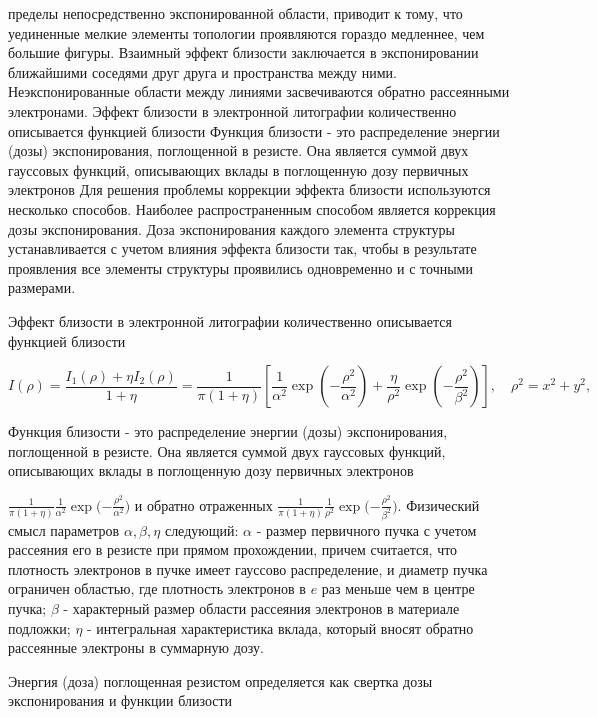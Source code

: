 пределы непосредственно экспонированной области, приводит к тому, что уединенные мелкие элементы топологии проявляются гораздо медленнее, чем большие фигуры. Взаимный эффект близости заключается в экспонировании ближайшими соседями друг друга и пространства между ними. Неэкспонированные области между линиями засвечиваются обратно рассеянными электронами.
Эффект близости в электронной литографии количественно описывается функцией близости
Функция близости - это распределение энергии (дозы) экспонирования, поглощенной в резисте. Она является суммой двух гауссовых функций, описывающих вклады в поглощенную дозу первичных электронов
Для решения проблемы коррекции эффекта близости используются несколько способов. Наиболее распространенным способом является коррекция дозы экспонирования. Доза экспонирования каждого элемента структуры устанавливается с учетом влияния эффекта близости так, чтобы в результате проявления все элементы структуры проявились одновременно и с точными размерами.

Эффект близости в электронной литографии количественно описывается функцией близости

\begin{equation}
I(\rho)=\frac{I_1 (\rho)+ \eta I_2(\rho)}{1+\eta}=\frac{1}{\pi(1+\eta)}\left[\frac{1}{\alpha^2}\exp\left(-\frac{\rho^2}{\alpha^2}\right)+\frac{\eta}{\rho^2}\exp\left(-\frac{\rho^2}{\beta^2}\right)\right],\quad \rho^2 = x^2 + y^2,
\label{eq:A8}
\end{equation}

Функция близости - это распределение энергии (дозы) экспонирования, поглощенной в резисте. Она является суммой двух гауссовых функций, описывающих вклады в поглощенную дозу первичных электронов

$\frac{1}{\pi(1+\eta)} \frac{1}{\alpha^2} \exp{(}-\frac{\rho^2}{\alpha^2}{)} $ и обратно отраженных $\frac{1}{\pi(1+\eta)} \frac{1}{\rho^2} \exp {(}-\frac{\rho^2}{\beta^2}{)}$. 
Физический смысл параметров $\alpha,\beta,\eta$ следующий: $\alpha$ - размер первичного пучка с учетом рассеяния его в резисте при прямом прохождении, причем считается, что плотность электронов в пучке имеет гауссово распределение, и диаметр пучка ограничен областью, где плотность электронов в $e$ раз меньше чем в центре пучка; $\beta$ - характерный размер области рассеяния электронов в материале подложки; $\eta$ - интегральная характеристика вклада, который вносят обратно рассеянные электроны в суммарную дозу.

Энергия (доза) поглощенная резистом определяется как свертка дозы экспонирования и функции близости


